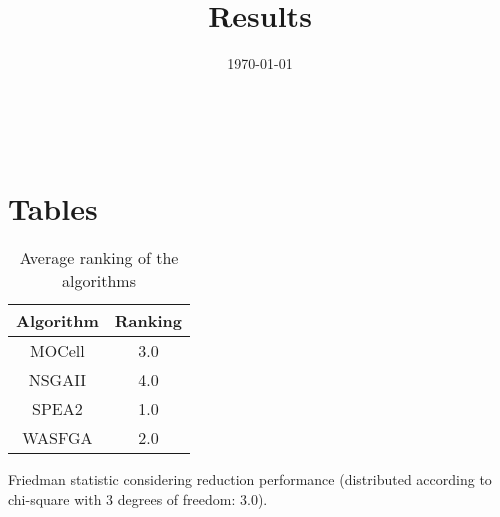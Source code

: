 \documentclass{article}
\title{Results}
\author{}
\date{\today}
\begin{document}
\oddsidemargin 0in \topmargin 0in\maketitle
\
\section{Tables}
\begin{table}[!htp]
\centering
\caption{Average ranking of the algorithms}
\begin{tabular}{c|c}
Algorithm&Ranking\\
\hline
MOCell&3.0\\
NSGAII&4.0\\
SPEA2&1.0\\
WASFGA&2.0\\
\end{tabular}
\end{table}


Friedman statistic considering reduction performance (distributed according to chi-square with 3 degrees of freedom: 3.0).
\end{document}
